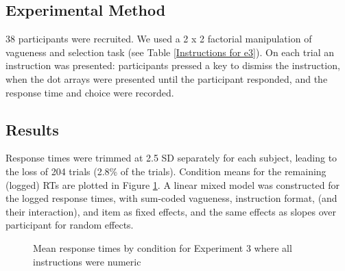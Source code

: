 \documentclass[%
man,		%
floatsintext,%
apacite%
]{apa6} %
\begin{document}
\subsection{Experimental Method} %

38 participants were recruited. We used a 2 x 2 factorial manipulation of vagueness and selection task (see Table \ref{Instructions for e3}).
On each trial an instruction was presented: participants pressed a key to dismiss the instruction, when the dot arrays were presented until the participant responded, and the response time and choice were recorded.

\subsection{Results} %

Response times were trimmed at 2.5 SD separately for each subject, leading to the loss of 204 trials (2.8\% of the trials).
Condition means for the remaining (logged) RTs are plotted in Figure \ref{resultse3}.
A linear mixed model was constructed for the logged response times, 
with sum-coded vagueness, instruction format, (and their interaction), and item as fixed effects, and the same effects as slopes over participant for random effects.

\begin{figure}[htbp]
\centering
{}
\caption{Mean response times by condition for Experiment 3 where all instructions were numeric}
\label{resultse3}
\end{figure}
\end{document}
